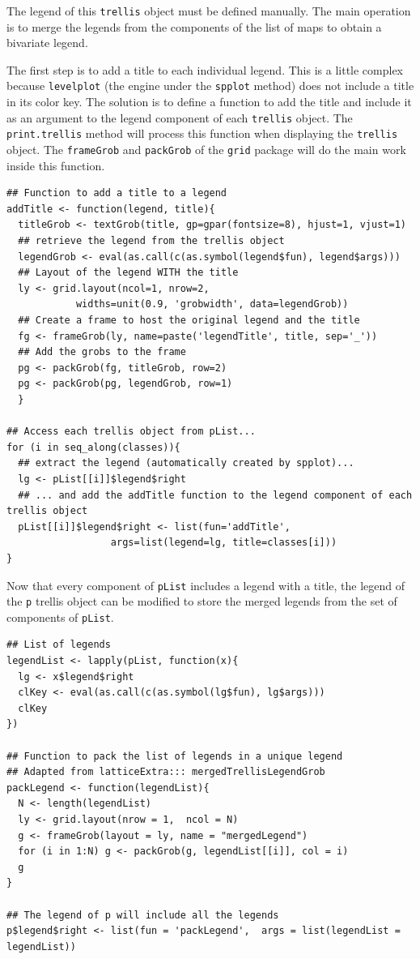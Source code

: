 The legend of this \texttt{trellis} object must be defined
manually. The main operation is to merge the legends from the
components of the list of maps to obtain a bivariate
legend. 

The first step is to add a title to each individual legend.  This is a
little complex because \texttt{levelplot} (the engine under the \texttt{spplot}
method) does not include a title in its color key. The solution is to
define a function to add the title and include it as an argument to
the legend component of each \texttt{trellis} object. The \texttt{print.trellis}
method will process this function when displaying the \texttt{trellis}
object. The \texttt{frameGrob} and \texttt{packGrob} of the \texttt{grid} package will do
the main work inside this function.

\lstset{language=R,numbers=none}
\begin{lstlisting}
## Function to add a title to a legend
addTitle <- function(legend, title){
  titleGrob <- textGrob(title, gp=gpar(fontsize=8), hjust=1, vjust=1)
  ## retrieve the legend from the trellis object
  legendGrob <- eval(as.call(c(as.symbol(legend$fun), legend$args)))
  ## Layout of the legend WITH the title
  ly <- grid.layout(ncol=1, nrow=2,
		    widths=unit(0.9, 'grobwidth', data=legendGrob))
  ## Create a frame to host the original legend and the title
  fg <- frameGrob(ly, name=paste('legendTitle', title, sep='_'))
  ## Add the grobs to the frame
  pg <- packGrob(fg, titleGrob, row=2)
  pg <- packGrob(pg, legendGrob, row=1)
  }

## Access each trellis object from pList...
for (i in seq_along(classes)){
  ## extract the legend (automatically created by spplot)...
  lg <- pList[[i]]$legend$right
  ## ... and add the addTitle function to the legend component of each trellis object
  pList[[i]]$legend$right <- list(fun='addTitle',
				  args=list(legend=lg, title=classes[i]))
}
\end{lstlisting}

Now that every component of \texttt{pList} includes a legend with a title,
the legend of the \texttt{p} trellis object can be modified to store the
merged legends from the set of components of \texttt{pList}.

\lstset{language=R,numbers=none}
\begin{lstlisting}
## List of legends
legendList <- lapply(pList, function(x){
  lg <- x$legend$right
  clKey <- eval(as.call(c(as.symbol(lg$fun), lg$args)))
  clKey
})

## Function to pack the list of legends in a unique legend
## Adapted from latticeExtra::: mergedTrellisLegendGrob
packLegend <- function(legendList){
  N <- length(legendList)
  ly <- grid.layout(nrow = 1,  ncol = N)
  g <- frameGrob(layout = ly, name = "mergedLegend")
  for (i in 1:N) g <- packGrob(g, legendList[[i]], col = i)
  g
}

## The legend of p will include all the legends
p$legend$right <- list(fun = 'packLegend',  args = list(legendList = legendList))
\end{lstlisting}

